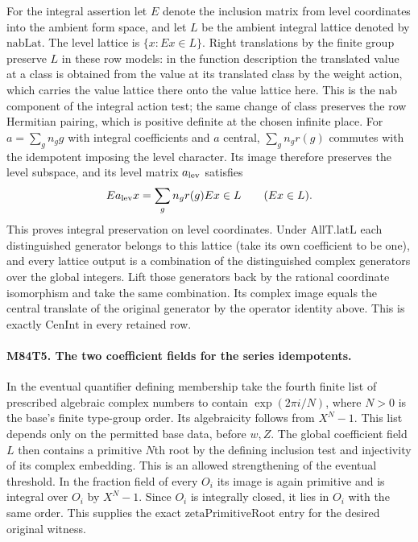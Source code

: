 For the integral assertion let $E$ denote the inclusion matrix
from level coordinates into the ambient form space, and let
$L$ be the ambient integral lattice denoted by $\mathrm{nabLat}$.
The level lattice is $\{x:Ex\in L\}$. Right translations by the
finite group preserve $L$ in these row models: in the function
description the translated value at a class is obtained from
the value at its translated class by the weight action, which
carries the value lattice there onto the value lattice here.
This is the $\mathrm{nab}$ component of the integral action
test; the same change of class preserves the row Hermitian
pairing, which is positive definite at the chosen infinite
place. For $a=\sum_g n_g g$ with integral coefficients and $a$
central, $\sum_g n_g r(g)$ commutes with the idempotent imposing
the level character. Its image therefore preserves the level
subspace, and its level matrix $a_{\rm lev}$ satisfies
\[
       E a_{\rm lev}x=\sum_g n_g r(g)Ex\in L\qquad(Ex\in L).
\]
This proves integral preservation on level coordinates. Under
$\mathrm{AllT}.\mathrm{latL}$ each distinguished generator
belongs to this lattice (take its own coefficient to be one),
and every lattice output is a combination of the distinguished
complex generators over the global integers. Lift those
generators back by the rational coordinate isomorphism and
take the same combination. Its complex image equals the
central translate of the original generator by the operator
identity above. This is exactly $\mathrm{CenInt}$ in every
retained row.

\paragraph{M84T5. The two coefficient fields for the series idempotents.}
In the eventual quantifier defining membership take the fourth
finite list of prescribed algebraic complex numbers to contain
$\exp(2\pi i/N)$, where $N>0$ is the base's finite type-group
order. Its algebraicity follows from $X^N-1$. This list depends
only on the permitted base data, before $w,Z$. The global
coefficient field $L$ then contains a primitive $N$th root by
the defining inclusion test and injectivity of its complex
embedding. This is an allowed strengthening of the eventual
threshold. In the fraction field of every $O_i$ its image is
again primitive and is integral over $O_i$ by $X^N-1$. Since
$O_i$ is integrally closed, it lies in $O_i$ with the same
order. This supplies the exact $\mathrm{zetaPrimitiveRoot}$
entry for the desired original witness.

